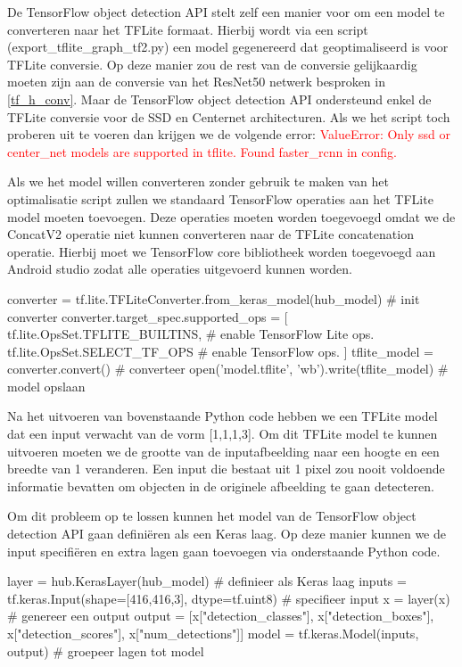 De TensorFlow object detection API stelt zelf een manier voor om een model te converteren naar het TFLite formaat.
Hierbij wordt via een script (export\_tflite\_graph\_tf2.py) een model gegenereerd dat geoptimaliseerd is voor TFLite conversie.
Op deze manier zou de rest van de conversie gelijkaardig moeten zijn aan de conversie van het ResNet50 netwerk besproken in \ref{tf_h_conv}.
Maar de TensorFlow object detection API ondersteund enkel de TFLite conversie voor de SSD en Centernet architecturen.
Als we het script toch proberen uit te voeren dan krijgen we de volgende error: 
\textcolor{red}{ValueError: Only ssd or center\_net models are supported in tflite. Found faster\_rcnn in config.}

Als we het model willen converteren zonder gebruik te maken van het optimalisatie script zullen we standaard TensorFlow operaties aan het TFLite model moeten toevoegen.
Deze operaties moeten worden toegevoegd omdat we de ConcatV2 operatie niet kunnen converteren naar de TFLite concatenation operatie.
Hierbij moet we TensorFlow core bibliotheek worden toegevoegd aan Android studio zodat alle operaties uitgevoerd kunnen worden.

\begin{python}
converter = tf.lite.TFLiteConverter.from_keras_model(hub_model) # init converter
converter.target_spec.supported_ops = [
    tf.lite.OpsSet.TFLITE_BUILTINS, # enable TensorFlow Lite ops.
    tf.lite.OpsSet.SELECT_TF_OPS # enable TensorFlow ops.
]
tflite_model = converter.convert() # converteer
open('model.tflite', 'wb').write(tflite_model) # model opslaan
\end{python}

Na het uitvoeren van bovenstaande Python code hebben we een TFLite model dat een input verwacht van de vorm [1,1,1,3].
Om dit TFLite model te kunnen uitvoeren moeten we de grootte van de inputafbeelding naar een hoogte en een breedte van 1 veranderen.
Een input die bestaat uit 1 pixel zou nooit voldoende informatie bevatten om objecten in de originele afbeelding te gaan detecteren.

Om dit probleem op te lossen kunnen het model van de TensorFlow object detection API gaan defini\"eren als een Keras laag.
Op deze manier kunnen we de input specifi\"eren en extra lagen gaan toevoegen via onderstaande Python code.

\begin{python} \label{testref}
layer = hub.KerasLayer(hub_model) # definieer als Keras laag
inputs = tf.keras.Input(shape=[416,416,3], dtype=tf.uint8) # specifieer input
x = layer(x) # genereer een output
output = [x["detection_classes"], x["detection_boxes"], x["detection_scores"], x["num_detections"]]
model = tf.keras.Model(inputs, output) # groepeer lagen tot model
\end{python}

